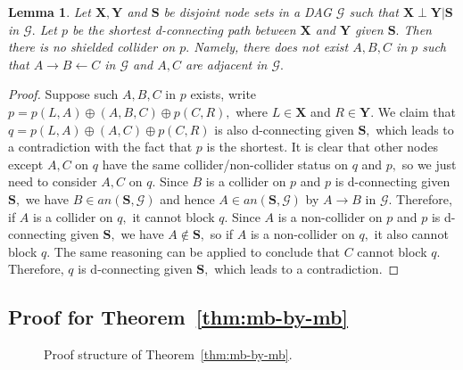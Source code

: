 \documentclass{article}
\newtheorem{lemma}{Lemma}
\begin{document}
\begin{lemma}
\label{lemma:shortest+collider}
Let $\mathbf{X}, \mathbf{Y}$ and $\mathbf{S}$ be disjoint node sets in a DAG $\mathcal{G}$ such that $\mathbf{X}\perp \mathbf{Y} | \mathbf{S}$ in $\mathcal{G}.$ Let $p$ be the shortest d-connecting path between $\mathbf{X}$ and $\mathbf{Y}$ given $\mathbf{S}.$ Then there is no shielded collider on $p.$ Namely, there does not exist $A,B,C$ in $p$ such that $A\to B\leftarrow C$ in $\mathcal{G}$ and $A,C$ are adjacent in $\mathcal{G}.$
\end{lemma}	
\begin{proof}
Suppose such $A,B,C$ in $p$ exists, write $p=p(L,A)\oplus (A,B,C)\oplus p(C,R),$ where $L\in\mathbf{X}$ and $R\in\mathbf{Y}.$ We claim that $q=p(L,A)\oplus (A,C)\oplus p(C,R)$ is also d-connecting given $\mathbf{S},$ which leads to a contradiction with the fact that $p$ is the shortest. It is clear that other nodes except $A,C$ on $q$ have the same collider/non-collider status on $q$ and $p,$ so we just need to consider $A,C$ on $q.$ Since $B$ is a collider on $p$ and $p$ is d-connecting given $\mathbf{S},$ we have $B\in an(\mathbf{S},\mathcal{G})$ and hence $A\in an(\mathbf{S},\mathcal{G})$ by $A\to B$ in $\mathcal{G}.$ Therefore, if $A$ is a collider on $q,$ it cannot block $q.$ Since $A$ is a non-collider on $p$ and $p$ is d-connecting given $\mathbf{S},$ we have $A\not\in\mathbf{S},$ so if $A$ is a non-collider on $q,$ it also cannot block $q.$ The same reasoning can be applied to conclude that $C$ cannot block $q.$ Therefore, $q$ is d-connecting given $\mathbf{S},$ which leads to a contradiction.
\end{proof}

\subsection{Proof for Theorem~\ref{thm:mb-by-mb}}

\begin{figure}[ht]
    \centering
    \caption{Proof structure of Theorem~\ref{thm:mb-by-mb}.}
    \label{fig:proof for thm1}
\end{figure}
\end{document}
